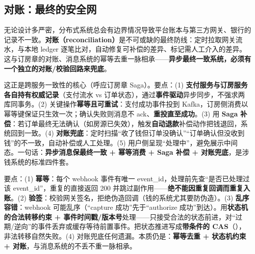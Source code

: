 \subsection{对账：最终的安全网}

无论设计多严密，分布式系统总会有边界情况导致平台账本与第三方网关、银行的记录不一致。\textbf{对账（reconciliation）}是不可或缺的最终防线：定时拉取网关流水，与本地 ledger 逐笔比对，自动修复可补偿的差异、标记需人工介入的差异。这与订房章的对账、消息系统的幂等去重一脉相承——\textbf{异步最终一致系统，必须有一个独立的对账/校验回路来兜底}。

\begin{followup}
这正是跨服务一致性的核心（呼应订房章 Saga）。要点：(1) \textbf{支付服务与订房服务各自持有权威记录}（支付流水 vs 订单状态），通过\textbf{事件驱动}异步同步，不强求两库同事务。(2) 关键操作\textbf{幂等且可重试}：支付成功事件投到 Kafka，订房侧消费以幂等键保证只生效一次；确认失败则消息不 ack、\textbf{重投直至成功}。(3) 用 \textbf{Saga 补偿}：若订单最终无法确认（如房源已失效），触发\textbf{自动退款}补偿动作把钱退回，系统回到一致。(4) \textbf{对账兜底}：定时扫描“收了钱但订单没确认”“订单确认但没收到钱”的不一致，自动补偿或人工处理。(5) 用户侧呈现“处理中”，避免展示中间态。一句话：\textbf{异步消息保最终一致 + 幂等消费 + Saga 补偿 + 对账兜底}，是涉钱系统的标准四件套。
\end{followup}

\begin{followup}
要点：(1) \textbf{幂等}：每个 webhook 事件有唯一 event\_id，处理前先查“是否已处理过该 event\_id”，重复的直接返回 200 并跳过副作用——\textbf{绝不能因重复回调而重复入账}。(2) \textbf{验签}：校验网关签名，拒绝伪造回调（钱的系统尤其要防伪造）。(3) \textbf{乱序容错}：webhook 可能乱序（“capture 成功”先于“authorize 成功”到达）。用\textbf{状态机的合法转移约束 + 事件时间戳/版本号}处理——只接受合法的状态前进，对“过期/逆向”的事件丢弃或缓存等待前置事件。把状态推进写成\textbf{带条件的 CAS}（），非法转移自然失败。(4) 对账兜底任何遗漏。本质仍是：\textbf{幂等去重 + 状态机约束 + 对账}，与消息系统的不丢不重一脉相承。
\end{followup}

